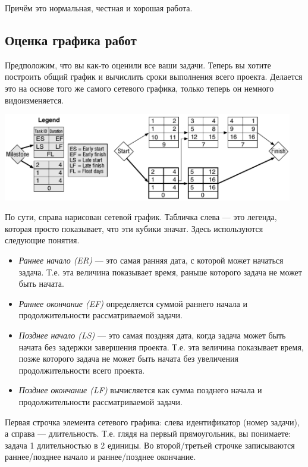 \documentclass{../../text-style}
\begin{document}
Причём это нормальная, честная и хорошая работа.

\subsection{Оценка графика работ}

Предположим, что вы как-то оценили все ваши задачи. Теперь вы хотите построить общий график и вычислить сроки выполнения всего проекта. Делается это на основе того же самого сетевого графика, только теперь он немного видоизменяется.

\begin{center}
    \includegraphics[width=0.95\textwidth]{graphEstimate.png}
\end{center}

По сути, справа нарисован сетевой график. Табличка слева --- это легенда, которая просто показывает, что эти кубики значат. Здесь используются следующие понятия.

\begin{itemize}
    \item \emph{Раннее начало (ER)} --- это самая ранняя дата, с которой может начаться задача. Т.е. эта величина показывает время, раньше которого задача не может быть начата.
    \item \emph{Раннее окончание (EF)} определяется суммой раннего начала и продолжительности рассматриваемой задачи.
    \item \emph{Позднее начало (LS)} --- это самая поздняя дата, когда задача может быть начата без задержки завершения проекта. Т.е. эта величина показывает время, позже которого задача не может быть начата без увеличения продолжительности всего проекта.
    \item \emph{Позднее окончание (LF)} вычисляется как сумма позднего начала и продолжительности рассматриваемой задачи.
\end{itemize}

Первая строчка элемента сетевого графика: слева идентификатор (номер задачи), а справа --- длительность. Т.е. глядя на первый прямоугольник, вы понимаете: задача 1 длительностью в 2 единицы. Во второй/третьей строчке записываются раннее/позднее начало и раннее/позднее окончание.
\end{document}
